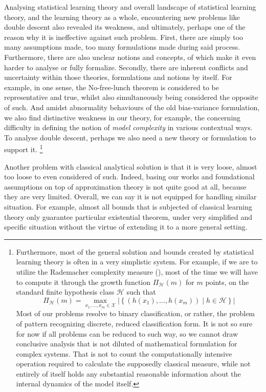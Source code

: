 \documentclass[10pt]{article}
\begin{document}
Analysing statistical learning theory and overall landscape of statistical learning theory, and the learning theory as a whole, encountering new problems like double descent also revealed its weakness, and ultimately, perhaps one of the reason why it is ineffective against such problem. First, there are simply too many assumptions made, too many formulations made during said process. Furthermore, there are also unclear notions and concepts, of which make it even harder to analyse or fully formalize. Secondly, there are inherent conflicts and uncertainty within those theories, formulations and notions by itself. For example, in one sense, the No-free-lunch theorem is considered to be representative and true, whilst also simultaneously being considered the opposite of such. And amidst abnormality behaviours of the old bias-variance formulation, we also find distinctive weakness in our theory, for example, the concerning difficulty in defining the notion of \textit{model complexity} in various contextual ways. To analyse double descent, perhaps we also need a new theory or formulation to support it. \footnote{Furthermore, most of the general solution and bounds created by statistical learning theory is often in a very simplistic system. For example, if we are to utilize the Rademacher complexity measure (\cite{10.5555/2371238}), most of the time we will have to compute it through the growth function $\Pi_{\mathcal{H}}(m)$ for $m$ points, on the standard finite hypothesis class $\mathcal{H}$ such that 
\begin{equation}
    \Pi_{\mathcal{H}}(m) = \max_{x_1, \dots, x_m \in \mathcal{X}} \left| \left\{ (h(x_1), \dots, h(x_m)) \mid h \in \mathcal{H} \right\} \right|
\end{equation}
Most of our problems resolve to binary classification, or rather, the problem of pattern recognizing discrete, reduced classification form. It is not so sure for now if all problems can be reduced to such way, so we cannot draw conclusive analysis that is not diluted of mathematical formulation for complex systems. That is not to count the computationally intensive operation required to calculate the supposedly classical measure, while not entirely of itself holds any substantial reasonable information about the internal dynamics of the model itself. }

Another problem with classical analytical solution is that it is very loose, almost too loose to even considered of such. Indeed, basing our works and foundational assumptions on top of approximation theory is not quite good at all, because they are very limited. Overall, we can say it is not equipped for handling similar situation. For example, almost all bounds that is subjected of classical learning theory only guarantee particular existential theorem, under very simplified and specific situation without the virtue of extending it to a more general setting. 
\end{document}
